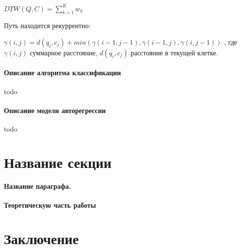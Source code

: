 \documentclass[12pt,twoside]{article}
\begin{document}
            $DTW(Q, C)=\displaystyle\sum_{k=1}^{K} w_k$
            
            Путь находится рекуррентно:
            
            $\gamma(i, j) = d(q_i, c_j) + min({\gamma(i-1, j-1), \gamma(i-1, j), \gamma(i, j-1)})$ , где $\gamma(i, j)$ суммарное расстояние, $d(q_i, c_j)$ расстояние в текущей клетке.
            
            \paragraph{Описание алгоритма классификации}
            
            todo
            
            \paragraph{Описание модели авторегрессии}
            
            todo
				
				
		
		\section{Название секции}
    \paragraph{Название параграфа.}
    \paragraph{Теоретическую часть работы}
    \section{Заключение}

		 
    
    
    
\end{document}
